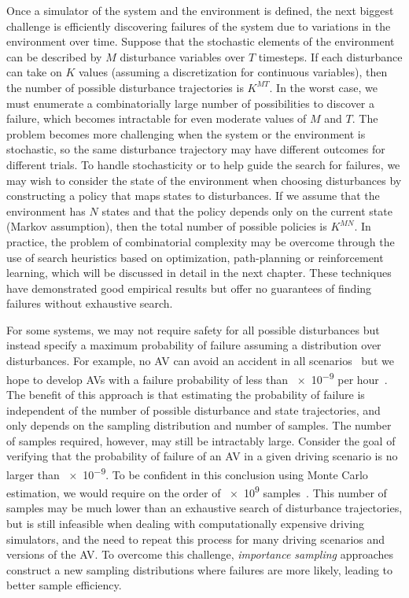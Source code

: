 Once a simulator of the system and the environment is defined, the next biggest challenge is efficiently discovering failures of the system due to variations in the environment over time. Suppose that the stochastic elements of the environment can be described by $M$ disturbance variables over $T$ timesteps. If each disturbance can take on $K$ values (assuming a discretization for continuous variables), then the number of possible disturbance trajectories is $K^{MT}$. In the worst case, we must enumerate a combinatorially large number of possibilities to discover a failure, which becomes intractable for even moderate values of $M$ and $T$. The problem becomes more challenging when the system or the environment is stochastic, so the same disturbance trajectory may have different outcomes for different trials. To handle stochasticity or to help guide the search for failures, we may wish to consider the state of the environment when choosing disturbances by constructing a policy that maps states to disturbances. If we assume that the environment has $N$ states and that the policy depends only on the current state (Markov assumption), then the total number of possible policies is $K^{MN}$. In practice, the problem of combinatorial complexity may be overcome through the use of search heuristics based on optimization, path-planning or reinforcement learning, which will be discussed in detail in the next chapter. These techniques have demonstrated good empirical results but offer no guarantees of finding failures without exhaustive search.

For some systems, we may not require safety for all possible disturbances but instead specify a maximum probability of failure assuming a distribution over disturbances. For example, no AV can avoid an accident in all scenarios~\cite{shalev2017formal} but we hope to develop AVs with a failure probability of less than \num{e-9} per hour~\cite{koopman2016challenges}. The benefit of this approach is that estimating the probability of failure is independent of the number of possible disturbance and state trajectories, and only depends on the sampling distribution and number of samples. The number of samples required, however, may still be intractably large. Consider the goal of verifying that the probability of failure of an AV in a given driving scenario is no larger than \num{e-9}. To be confident in this conclusion using Monte Carlo estimation, we would require on the order of \num{e9} samples~\cite{koopman2016challenges}. This number of samples may be much lower than an exhaustive search of disturbance trajectories, but is still infeasible when dealing with computationally expensive driving simulators, and the need to repeat this process for many driving scenarios and versions of the AV. To overcome this challenge, \emph{importance sampling} approaches construct a new sampling distributions where failures are more likely, leading to better sample efficiency. 

